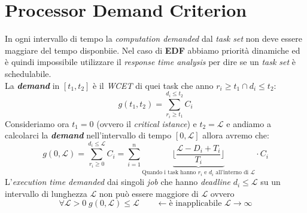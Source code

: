 \section{Processor Demand Criterion}
In ogni intervallo di tempo la \textit{computation demanded} dal \textit{task set} non deve essere maggiare del tempo disponbiie. Nel caso di \textbf{EDF} abbiamo priorità dinamiche ed è quindi impossibile utilizzare il \textit{response time analysis} per dire se un \textit{task set} è schedulabile. \\
La \textbf{\textit{demand}} in $[t_1, t_2]$ è il \textit{WCET} di quei task che anno $r_i \geq t_1 \cap d_i \leq t_2$: \[ g(t_1, t_2) = \sum_{r_i \geq t_1}^{d_i \leq t_2} C_i\]
Consideriamo ora $t_1 = 0$ (ovvero il \textit{critical istance}) e $t_2 = \mathcal{L}$ e andiamo a calcolarci la \textbf{\textit{demand}} nell'intervallo di tempo $[0, \mathcal{L}]$ allora avremo che: \[g(0, \mathcal{L}) = \sum_{r_i \geq 0}^{d_i \leq \mathcal{L}} C_i = \sum_{i=1}^n \underbrace{\lfloor \frac{\mathcal{L} - D_i + T_i}{T_i} \rfloor}_{\text{Quando i task hanno }r_i\text{ e }d_i \text{ all'interno di }\mathcal{L}} \cdot C_i\]
L'\textit{execution time demanded} dai singoli \textit{job} che hanno \textit{deadline} $d_i \leq \mathcal{L}$ su un intervallo di lunghezza $\mathcal{L}$ non può essere maggiore di $\mathcal{L}$ ovvero \[ \forall \mathcal{L} > 0 \; g(0, \mathcal{L}) \leq \mathcal{L} \qquad \leftarrow \text{è inapplicabile } \mathcal{L} \rightarrow \infty \]
